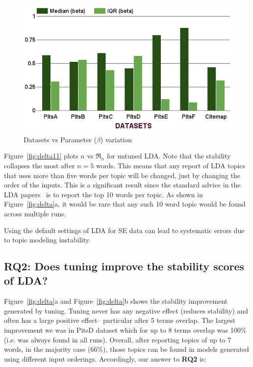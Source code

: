 \documentclass[twocolumn,5p,sort&compress]{elsarticle}
\theoremstyle{break}
\begin{document}
\begin{figure}[!t]
\begin{minipage}{.33\textwidth}
        \includegraphics[width=\linewidth]{./fig/Parameters_variation_b.png}
        \caption{Datasets vs Parameter ($\beta$) variation}
        \label{RQ3:b}
    \end{minipage}
\end{figure}

Figure~\ref{fig:delta11}   plots $n$ vs $\Re_n$ for untuned  LDA.
Note that the  stability collapses the most after $n=5$ words. This means
  that any report of LDA topics that uses more than five words per topic will
  be changed, just by changing the order of the inputs. This is a significant result
  since the standard advice in the LDA papers~\cite{panichella2013effectively, lukins2010bug}
  is to report the top 10 words per topic. As shown in Figure~\ref{fig:delta}a, it would
  be rare that any such 10 word topic would be found across multiple runs.
 \begin{lesson}
  Using the default settings of LDA for SE data can lead to systematic errors due to topic
  modeling instability. 
\end{lesson}


\subsection{\textbf{RQ2: Does tuning improve the stability scores of LDA?}}\label{sect:stable}

 Figure~\ref{fig:delta}a and Figure~\ref{fig:delta}b shows the stability improvement
 generated by tuning.
   Tuning never
  has any negative effect (reduces stability) and often has a large positive effect--
  particular  after 5 terms overlap.
   The largest improvement  we
   was  in PitsD dataset which for up to 8 terms overlap was 100\% (i.e. was always
   found in all runs).
   Overall, after reporting topics of up to 7 words, in the majority case (66\%),
  those topics can be found in models generated using different input orderings.
  Accordingly, our answer to {\bf RQ2} is:
\end{document}
